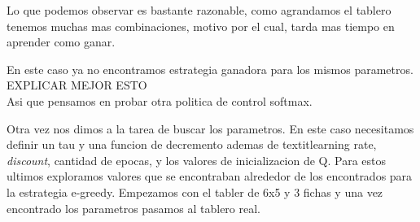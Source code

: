 Lo que podemos observar es bastante razonable, como agrandamos el tablero tenemos muchas mas combinaciones, motivo por el cual, tarda mas tiempo en aprender como ganar. 

En este caso ya no encontramos estrategia ganadora para los mismos parametros.
{\huge EXPLICAR MEJOR ESTO}\\







Asi que pensamos en probar otra politica de control softmax. 

Otra vez nos dimos a la tarea de buscar los parametros. En este caso necesitamos definir un tau y una funcion de decremento ademas de textit{learning rate}, \textit{discount}, cantidad de epocas, y los valores de inicializacion de Q. Para estos ultimos exploramos valores que se encontraban alrededor de los encontrados para la estrategia e-greedy. 
Empezamos con el tabler de 6x5 y 3 fichas y una vez encontrado los parametros pasamos al tablero real. 





 